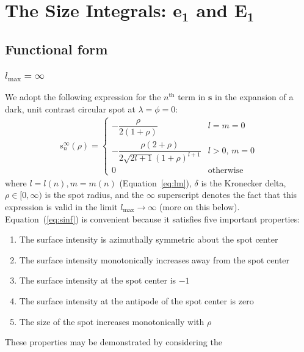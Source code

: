 \documentclass[modern]{aastex62}
\begin{document}
%
\section{The Size Integrals: \lowercase{$\mathbf{e_1}$} and $\mathbf{E_1}$}
\label{sec:size}
%
\subsection{Functional form}
%

\subsubsection{$l_{\mathrm{max}} = \infty$}
\label{sec:size-function}
%
We adopt the following expression for the $n^{\mathrm{th}}$ term in $\mathbf{s}$
in the expansion of a dark, unit contrast circular spot at
$\lambda = \phi = 0$:
%
\begin{align}
    \label{eq:sinf}
    s_{n}^\infty(\rho) =
    \begin{cases}
        -\dfrac{\rho}{2(1 + \rho)}
         & l = m = 0
        \\[1em]
        -\dfrac{\rho \left( 2 + \rho \right)}
        {2 \sqrt{2l + 1} (1 + \rho)^{l + 1}}
         & l > 0, \, m = 0
        \\[1em]
        0
         & \mathrm{otherwise}
    \end{cases}
\end{align}
%
where
$l = l(n), m = m(n)$ (Equation~\ref{eq:lm}),
$\delta$ is the Kronecker delta,
$\rho \in [0, \infty)$ is the spot radius,
and the $\infty$ superscript denotes the fact that this expression
is valid in the limit $l_{\mathrm{max}} \rightarrow \infty$
(more on this below).
Equation~(\ref{eq:sinf}) is convenient because it satisfies
five important properties:
%
\begin{enumerate}[itemsep=2pt,parsep=1pt,label=\textbf{\arabic*}]
    \item The surface intensity is azimuthally symmetric about the spot center
    \item The surface intensity monotonically increases away from the spot center
    \item The surface intensity at the spot center is $-1$
    \item The surface intensity at the antipode of the spot center is zero
    \item The size of the spot increases monotonically with $\rho$
\end{enumerate}
%
These properties may be demonstrated by considering the
\end{document}
